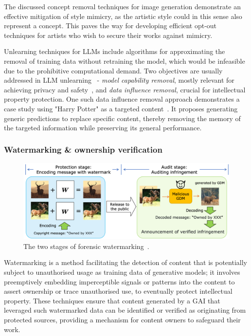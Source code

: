 \documentclass[conference,table]{IEEEtran} %
\begin{document}
The discussed concept removal techniques for image generation demonstrate an effective mitigation of style mimicry, as the artistic style could in this sense also represent a concept. 
This paves the way for developing efficient opt-out techniques for artists who wish to secure their works against mimicry. 

Unlearning techniques for LLMs include algorithms for approximating the removal of training data without retraining the model, which would be infeasible due to the prohibitive computational demand. 
Two objectives are usually addressed in LLM unlearning~\cite{liu_rethinking_2024} - \textit{model capability removal}, mostly relevant for achieving privacy and safety~\cite{jang_knowledge_2022,wu_depn_2023,lu_quark_2022}, and \textit{data influence removal}, crucial for intellectual property protection.
One such data influence removal approach demonstrates a case study using "Harry Potter" as a targeted content~\cite{eldan_whos_2023}. 
It proposes generating generic predictions to replace specific content, thereby removing the memory of the targeted information while preserving its general performance. 

\subsubsection{Watermarking \& ownership verification} \label{sec:mitigation-watermarking}
\begin{figure}
    \centering
    \includegraphics[width=\linewidth]{figures/watermarking-stages.PNG}
    \caption{The two stages of forensic watermarking~\cite{cui_diffusionshield_2023}.}
    \label{fig:watermarking-stages}
\end{figure}
Watermarking is a method facilitating the detection of content that is potentially subject to unauthorised usage as training data of generative models; it involves preemptively embedding imperceptible signals or patterns into the content to assert ownership or trace unauthorised use, to eventually protect intellectual property. 
These techniques ensure that content generated by a GAI that leveraged such watermarked data can be identified or verified as originating from protected sources, providing a mechanism for content owners to safeguard their work. 
\end{document}
